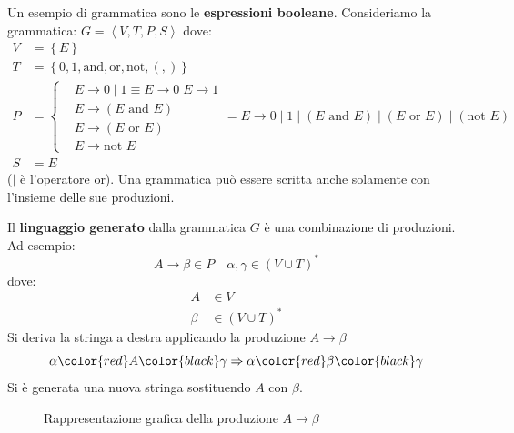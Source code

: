 \documentclass[a4paper]{article}
\begin{document}
\begin{example}
  Un esempio di grammatica sono le \textbf{espressioni booleane}.
  Consideriamo la grammatica: \( G = \left< V, T, P, S \right> \) dove:
  \[
    \begin{aligned}
      V &= \left\{ E \right\}\\
      T &= \left\{ 0, 1, \text{and}, \text{or}, \text{not}, (, ) \right\}\\
      P &= \left\{
        \begin{aligned}
          &E \to 0 \;|\; 1 \equiv E \to 0 \; E \to 1\\
          &E \to (E \text{ and } E)\\
          &E \to (E \text{ or } E)\\
          &E \to \text{not } E
        \end{aligned}
      \right. = 
      E \to 0 \;|\; 1 \;|\; (E \text{ and } E) \;|\; (E \text{ or } E) \;|\; (\text{not } E)
      \\
        S &= E
    \end{aligned}
  \] 
  (\( | \) è l'operatore or). Una grammatica può essere scritta anche solamente con
  l'insieme delle sue produzioni.

  \vspace{1em}
  \noindent
  Il \textbf{linguaggio generato} dalla grammatica \( G \) è una combinazione di
  produzioni. Ad esempio:
  \[
    A \to \beta \in P \quad \alpha, \gamma \in (V \cup T)^*
  \] 
  dove:
  \[
  \begin{aligned}
    A &\in V\\
    \beta &\in (V \cup T)^*
  \end{aligned}
  \] 
  Si deriva la stringa a destra applicando la produzione \( A \to \beta \) 
  \[
    \alpha \color{red}A\color{black} \gamma \Rightarrow \alpha \color{red}\beta\color{black} \gamma
  \] 
  Si è generata una nuova stringa sostituendo \( A \) con \( \beta \).
  \begin{figure}[H]
    \centering
    \caption{Rappresentazione grafica della produzione \( A \to \beta \)}
  \end{figure}
  \begin{figure}[H]
    \centering
\end{figure}
\end{example}
\end{document}
